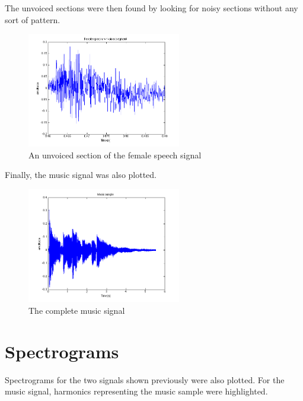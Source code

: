 \documentclass[11pt]{article}   %
\begin{document}
The unvoiced sections were then found by looking for noisy sections without any sort of pattern.

\begin{figure}[H]
\begin{center}
\leavevmode
\includegraphics[width=0.6\textwidth]{unvoiced.png}
\end{center}
\caption{An unvoiced section of the female speech signal}
\label{euler:1}
\end{figure}

Finally, the music signal was also plotted.

\begin{figure}[H]
\begin{center}
\leavevmode
\includegraphics[width=0.6\textwidth]{music.png}
\end{center}
\caption{The complete music signal}
\label{euler:1}
\end{figure}

\newpage
\section{Spectrograms}

Spectrograms for the two signals shown previously were also plotted. For the music signal, harmonics representing the music sample were highlighted.
\end{document}
